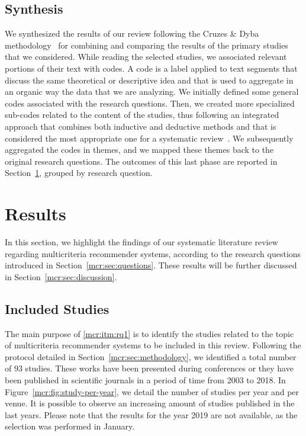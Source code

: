 \subsection{Synthesis}
We synthesized the results of our review following the Cruzes \& Dyba methodology~\cite{Cruzes2011} for combining and comparing the results of the primary studies that we considered. While reading the selected studies, we associated relevant portions of their text with codes. A code is a label applied to text segments that discuss the same theoretical or descriptive idea and that is used to aggregate in an organic way the data that we are analyzing. We initially defined some general codes associated with the research questions. Then, we created more specialized sub-codes related to the content of the studies, thus following an integrated approach that combines both inductive and deductive methods and that is considered the most appropriate one for a systematic review~\cite{Cruzes2011}. We subsequently aggregated the codes in themes, and we mapped these themes back to the original research questions. The outcomes of this last phase are reported in Section~\ref{mcr:sec:results}, grouped by research question.

\section{Results}
\label{mcr:sec:results}

In this section, we highlight the findings of our systematic literature review regarding multicriteria recommender systems, according to the research questions introduced in Section~\ref{mcr:sec:questions}. These results will be further discussed in Section~\ref{mcr:sec:discussion}.

\subsection{Included Studies}
\label{mcr:sec:included}

The main purpose of \ref{mcr:itm:rq1} is to identify the studies related to the topic of multicriteria recommender systems to be included in this review. Following the protocol detailed in Section~\ref{mcr:sec:methodology}, we identified a total number of $93$ studies. These works have been presented during conferences or they have been published in scientific journals in a period of time from 2003 to 2018. In Figure~\ref{mcr:fig:study-per-year}, we detail the number of studies per year and per venue. It is possible to observe an increasing amount of studies published in the last years. Please note that the results for the year 2019 are not available, as the selection was performed in January.

